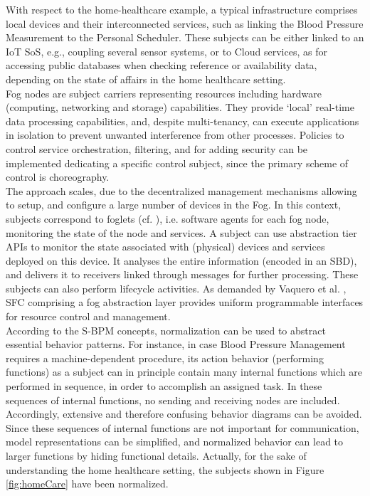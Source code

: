 With respect to the home-healthcare example, a typical infrastructure comprises local devices and their interconnected services, such as linking the Blood Pressure Measurement to the Personal Scheduler. These subjects can be either linked to an IoT SoS, e.g., coupling several sensor systems, or to Cloud services, as for accessing public databases when checking reference or availability data, depending on the state of affairs in the home healthcare setting.
\\
Fog nodes are subject carriers representing resources including hardware (computing, networking and storage) capabilities. They provide ‘local’ real-time data processing capabilities, and, despite multi-tenancy, can execute applications in isolation to prevent unwanted interference from other processes. Policies to control service orchestration, filtering, and for adding security can be implemented dedicating a specific control subject, since the primary scheme of control is choreography.
\\
The approach scales, due to the decentralized management mechanisms allowing to setup, and configure a large number of devices in the Fog. In this context, subjects correspond to foglets (cf. \cite{article:OoTAnalytics}), i.e. software agents for each fog node, monitoring the state of the node and services. A subject can use abstraction tier APIs to monitor the state associated with (physical) devices and services deployed on this device. It analyses the entire information (encoded in an SBD), and delivers it to receivers linked through messages for further processing. These subjects can also perform lifecycle activities. As demanded by Vaquero et al. \cite{article:FiningwayFog}, SFC comprising a fog abstraction layer provides uniform programmable interfaces for resource control and management. 
\\
According to the S-BPM concepts, normalization can be used to abstract essential behavior patterns. For instance, in case Blood Pressure Management requires a machine-dependent procedure, its action behavior (performing functions) as a subject can in principle contain many internal functions which are performed in sequence, in order to accomplish an assigned task. In these sequences of internal functions, no sending and receiving nodes are included. Accordingly, extensive and therefore confusing behavior diagrams can be avoided. Since these sequences of internal functions are not important for communication, model representations can be simplified, and normalized behavior can lead to larger functions by hiding functional details. Actually, for the sake of understanding the home healthcare setting, the subjects shown in Figure \ref{fig:homeCare} have been normalized.
